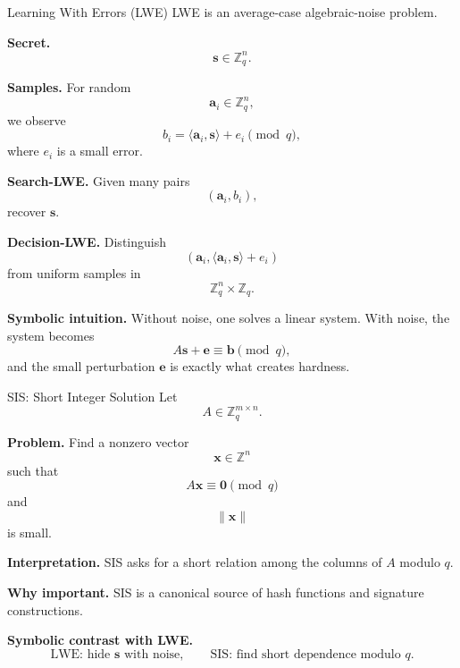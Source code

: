 \documentclass[aspectratio=169]{beamer}
\begin{document}
	
	\begin{frame}{Learning With Errors (LWE)}
		LWE is an average-case algebraic-noise problem.
		
		\textbf{Secret.}
		\[
		\bm{s} \in \mathbb{Z}_q^n.
		\]
		
		\textbf{Samples.}
		For random
		\[
		\bm{a}_i \in \mathbb{Z}_q^n,
		\]
		we observe
		\[
		b_i = \langle \bm{a}_i,\bm{s} \rangle + e_i \pmod q,
		\]
		where $e_i$ is a small error.
		
		\vspace{0.4em}
		\textbf{Search-LWE.}
		Given many pairs
		\[
		(\bm{a}_i,b_i),
		\]
		recover $\bm{s}$.
		
		\textbf{Decision-LWE.}
		Distinguish
		\[
		(\bm{a}_i,\langle \bm{a}_i,\bm{s}\rangle + e_i)
		\]
		from uniform samples in
		\[
		\mathbb{Z}_q^n \times \mathbb{Z}_q.
		\]
		
		\vspace{0.4em}
		\textbf{Symbolic intuition.}
		Without noise, one solves a linear system.
		With noise, the system becomes
		\[
		A\bm{s} + \bm{e} \equiv \bm{b} \pmod q,
		\]
		and the small perturbation $\bm{e}$ is exactly what creates hardness.
	\end{frame}
	
	
	\begin{frame}{SIS: Short Integer Solution}
		Let
		\[
		A \in \mathbb{Z}_q^{m \times n}.
		\]
		
		\textbf{Problem.}
		Find a nonzero vector
		\[
		\bm{x} \in \mathbb{Z}^n
		\]
		such that
		\[
		A\bm{x} \equiv \bm{0} \pmod q
		\]
		and
		\[
		\|\bm{x}\|
		\]
		is small.
		
		\vspace{0.4em}
		\textbf{Interpretation.}
		SIS asks for a short relation among the columns of $A$ modulo $q$.
		
		\vspace{0.4em}
		\textbf{Why important.}
		SIS is a canonical source of hash functions and signature constructions.
		
		\vspace{0.4em}
		\textbf{Symbolic contrast with LWE.}
		\[
		\text{LWE: hide } \bm{s} \text{ with noise},
		\qquad
		\text{SIS: find short dependence modulo } q.
		\]
	\end{frame}
	
	
\end{document}
